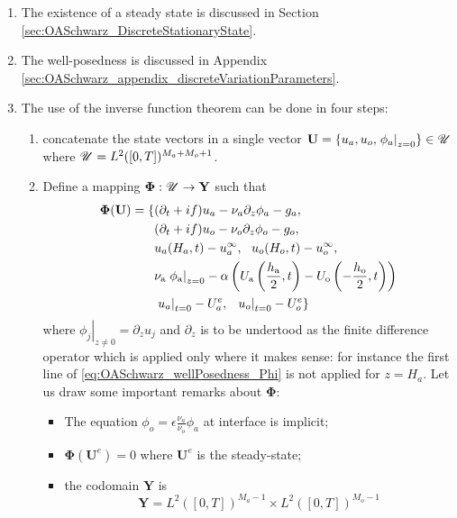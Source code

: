 \begin{enumerate}
	\item The existence of a steady state is discussed in
	Section \ref{sec:OASchwarz_DiscreteStationaryState}.
	\item The well-posedness is discussed in Appendix
	\ref{sec:OASchwarz_appendix_discreteVariationParameters}.
	\item The use of the inverse function theorem can be
		done in four steps:
	\begin{enumerate}
		\item concatenate the state vectors
			in a single vector $\mathbf{U}=
			\{u_a, u_o, \left.\phi_a\right|_{z=0}\}
			\in \mathbf{\cal U}$
		where $\mathbf{\cal U} = L^2([0,T])^{M_a+M_o+1}$.
		\item
	Define a mapping
	$\mathbf{\Phi}: \mathbf{\cal U}\rightarrow \mathbf{Y}$
	such that
\begin{equation}
	\label{eq:OASchwarz_wellPosedness_Phi}
\begin{aligned}
	\mathbf{\Phi}(\mathbf{U}) =
	\{&(\partial_t + if) u_a - \nu_a\partial_z \phi_a - g_a, \\
	&(\partial_t + if) u_o - \nu_o\partial_z \phi_o - g_o, \\
	&u_a(H_a, t) - u^\infty_a, ~~ u_o(H_o, t) - u^\infty_o, \\
	&\nu_{\rm a}\left.\phi_{\rm a}\right|_{z=0} - \alpha
	\left( U_{\rm a}\left(\frac{h_{\rm a}}{2},
	t\right) - U_{\rm o}\left(-\frac{h_{\rm o}}{2},
	t\right)\right) \\
	&\left.u_a\right|_{t=0} - U^e_{a}, ~~
	\left.u_o\right|_{t=0} - U^e_{o}\}
\end{aligned}
\end{equation}
where $\left.\phi_j\right|_{z\neq 0} = \partial_z u_j$
and $\partial_z$ is to be undertood as the finite difference
operator which is applied only where it makes sense:
for instance the first line of \eqref{eq:OASchwarz_wellPosedness_Phi}
is not applied for $z=H_a$.
Let us draw some important remarks about $\mathbf{\Phi}$:
\begin{itemize}
 \item The equation $\phi_o = \epsilon \frac{\nu_a}{\nu_o}\phi_a$
	 at interface is implicit;
 \item $\mathbf{\Phi}(\mathbf{U}^e)=0$
 	where $\mathbf{U}^e$
 	is the steady-state;
 \item the codomain $\mathbf{Y}$ is
 	\begin{equation}
		\mathbf{Y}=L^2([0,T])^{M_a-1}
			\times L^2([0,T])^{M_o-1}

\end{equation}
\end{itemize}
\end{enumerate}
\end{enumerate}
